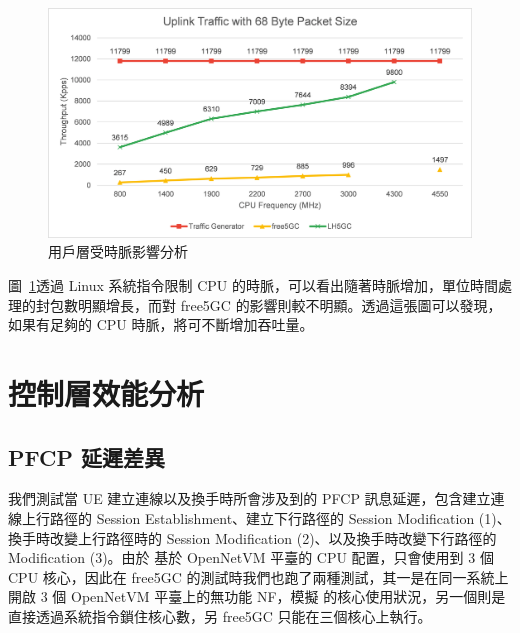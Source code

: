 \begin{figure}[htb]
    \centering
    \includegraphics[height=!,width=0.8\linewidth,keepaspectratio=true]{figures/up_cpu_clock}
    \caption[用戶層受時脈影響分析]{{\footnotesize 用戶層受時脈影響分析}}
    \label{fig:up_cpu_clock}
\end{figure}

圖~\ref{fig:up_cpu_clock}透過 Linux 系統指令限制 CPU 的時脈，可以看出隨著時脈增加，\LHCN 單位時間處理的封包數明顯增長，而對 free5GC 的影響則較不明顯。透過這張圖可以發現，如果有足夠的 CPU 時脈，\LHCN 將可不斷增加吞吐量。

\section{控制層效能分析}
\label{sec:cp_evaluation}

\subsection{PFCP 延遲差異}
\label{subsec:pfcp_comp}

我們測試當 UE 建立連線以及換手時所會涉及到的 PFCP 訊息延遲，包含建立連線上行路徑的 Session Establishment、建立下行路徑的 Session Modification (1)、換手時改變上行路徑時的 Session Modification (2)、以及換手時改變下行路徑的 Modification (3)。由於 \LHCN 基於 OpenNetVM 平臺的 CPU 配置，只會使用到 3 個 CPU 核心，因此在 free5GC 的測試時我們也跑了兩種測試，其一是在同一系統上開啟 3 個 OpenNetVM 平臺上的無功能 NF，模擬 \LHCN 的核心使用狀況，另一個則是直接透過系統指令鎖住核心數，另 free5GC 只能在三個核心上執行。

